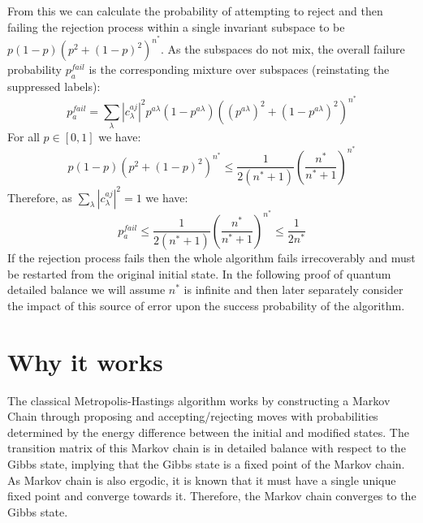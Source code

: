 \documentclass[aps,floatfix,10pt,amssymb,amsfont,amsmath,superscriptaddress,float,nofootinbib,longbibliography,nobalancelastpage,twocolumn]{revtex4-2}
\begin{document}
From this we can calculate the probability of attempting to reject and then failing the rejection process within a single invariant subspace to be $p(1-p)(p^2 +(1-p)^2)^{n^*}$. As the subspaces do not mix, the overall failure probability $p_a^{fail}$ is the corresponding mixture over subspaces (reinstating the suppressed labels):
\begin{equation}
   p_a^{fail} =  \sum_{\lambda}|c^{aj}_{\lambda}|^2p^{a\lambda}(1-p^{a\lambda})((p^{a\lambda})^2 +(1-p^{a\lambda})^2)^{n^*}
\end{equation}
For all $p \in [0,1]$ we have: 
\begin{equation}
    p(1-p)(p^2 +(1-p)^2)^{n^*} \leq \frac{1}{2(n^*+1)} \left(\frac{n^*}{n^*+1}\right)^{n^*}
\end{equation}
Therefore, as $\sum_{\lambda}|c^{aj}_{\lambda}|^2=1$ we have:
\begin{equation}
    \label{eq:probabilty_of_rejection}
   p_a^{fail} \leq \frac{1}{2(n^*+1)} \left(\frac{n^*}{n^*+1}\right)^{n^*} \leq \frac{1}{2n^*}
\end{equation}
If the rejection process fails then the whole algorithm fails irrecoverably and must be restarted from the original initial state. In the following proof of quantum detailed balance we will assume $n^*$ is infinite and then later separately consider the impact of this source of error upon the success probability of the algorithm.

\label{section:rejection}

\section{Why it works}
\label{section:why}
The classical Metropolis-Hastings algorithm works by constructing a Markov Chain through proposing and accepting/rejecting moves with probabilities determined by the energy difference between the initial and modified states. The transition matrix of this Markov chain is in detailed balance with respect to the Gibbs state, implying that the Gibbs state is a fixed point of the Markov chain. As Markov chain is also ergodic, it is known that it must have a single unique fixed point and converge towards it. Therefore, the Markov chain converges to the Gibbs state.
\end{document}
